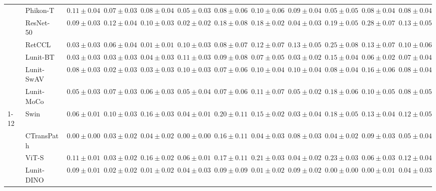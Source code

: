 \begin{tabular}{ll|cccc|c|cccc|c}
 & Phikon-T~\cite{filiot2023scaling} & $0.11 \pm 0.04$ & $0.07 \pm 0.03$ & $0.08 \pm 0.04$ & $0.05 \pm 0.03$ & $0.08 \pm 0.06$ & $0.10 \pm 0.06$ & $0.09 \pm 0.04$ & $0.05 \pm 0.05$ & $0.08 \pm 0.04$ & $0.08 \pm 0.04$ \\
 & ResNet-50~\cite{he2015deep} & $0.09 \pm 0.03$ & $0.12 \pm 0.04$ & $0.10 \pm 0.03$ & $\mathbf{0.02 \pm 0.02}$ & $0.18 \pm 0.08$ & $0.18 \pm 0.02$ & $0.04 \pm 0.03$ & $0.19 \pm 0.05$ & $0.28 \pm 0.07$ & $0.13 \pm 0.05$ \\
 & RetCCL~\cite{wang2023retccl} & $0.03 \pm 0.03$ & $0.06 \pm 0.04$ & $\mathbf{0.01 \pm 0.01}$ & $0.10 \pm 0.03$ & $0.08 \pm 0.07$ & $0.12 \pm 0.07$ & $0.13 \pm 0.05$ & $0.25 \pm 0.08$ & $0.13 \pm 0.07$ & $0.10 \pm 0.06$ \\
 & Lunit-BT~\cite{kang2023benchmarking} & $0.03 \pm 0.03$ & $0.03 \pm 0.03$ & $0.04 \pm 0.03$ & $0.11 \pm 0.03$ & $0.09 \pm 0.08$ & $0.07 \pm 0.05$ & $\mathbf{0.03 \pm 0.02}$ & $0.15 \pm 0.04$ & $0.06 \pm 0.02$ & $0.07 \pm 0.04$ \\
 & Lunit-SwAV~\cite{kang2023benchmarking} & $0.08 \pm 0.03$ & $\mathbf{0.02 \pm 0.03}$ & $0.03 \pm 0.03$ & $0.10 \pm 0.03$ & $0.07 \pm 0.06$ & $0.10 \pm 0.04$ & $0.10 \pm 0.04$ & $0.08 \pm 0.04$ & $0.16 \pm 0.06$ & $0.08 \pm 0.04$ \\
 & Lunit-MoCo~\cite{kang2023benchmarking} & $0.05 \pm 0.03$ & $0.07 \pm 0.03$ & $0.06 \pm 0.03$ & $0.05 \pm 0.04$ & $0.07 \pm 0.06$ & $0.11 \pm 0.07$ & $0.05 \pm 0.02$ & $0.18 \pm 0.06$ & $0.10 \pm 0.05$ & $0.08 \pm 0.05$ \\
\cline{1-12}
\multirow[t]{12}{*}{Mean pool} & Swin~\cite{liu2021swin} & $0.06 \pm 0.01$ & $0.10 \pm 0.03$ & $0.16 \pm 0.03$ & $0.04 \pm 0.01$ & $0.20 \pm 0.11$ & $0.15 \pm 0.02$ & $0.03 \pm 0.04$ & $0.18 \pm 0.05$ & $0.13 \pm 0.04$ & $0.12 \pm 0.05$ \\
 & CTransPath~\cite{wang2022transformer} & $\mathbf{0.00 \pm 0.00}$ & $0.03 \pm 0.02$ & $0.04 \pm 0.02$ & $\mathbf{0.00 \pm 0.00}$ & $0.16 \pm 0.11$ & $0.04 \pm 0.03$ & $0.08 \pm 0.03$ & $0.04 \pm 0.02$ & $0.09 \pm 0.03$ & $0.05 \pm 0.04$ \\
 & ViT-S~\cite{kolesnikov2021image} & $0.11 \pm 0.01$ & $0.03 \pm 0.02$ & $0.16 \pm 0.02$ & $0.06 \pm 0.01$ & $0.17 \pm 0.11$ & $0.21 \pm 0.03$ & $0.04 \pm 0.02$ & $0.23 \pm 0.03$ & $0.06 \pm 0.03$ & $0.12 \pm 0.04$ \\
 & Lunit-DINO~\cite{kang2023benchmarking} & $0.09 \pm 0.01$ & $0.02 \pm 0.02$ & $\mathbf{0.01 \pm 0.02}$ & $0.04 \pm 0.03$ & $\mathbf{0.09 \pm 0.09}$ & $\mathbf{0.01 \pm 0.02}$ & $0.09 \pm 0.02$ & $\mathbf{0.00 \pm 0.00}$ & $\mathbf{0.00 \pm 0.01}$ & $\mathbf{0.04 \pm 0.03}$ \\

\end{tabular}
